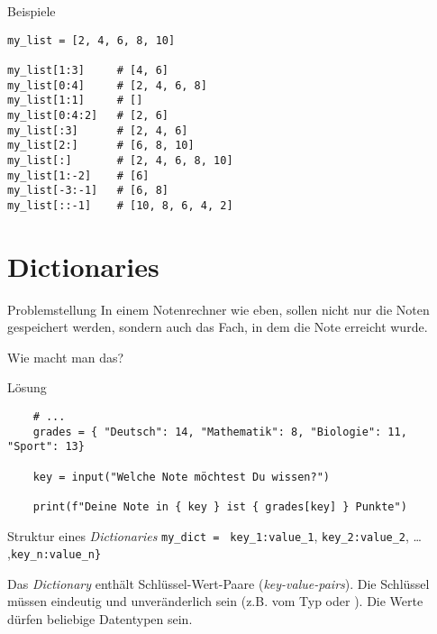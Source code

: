 \begin{fragile}
\begin{exampleblock}{Beispiele}
\begin{overprint}
\begin{verbatim}
my_list = [2, 4, 6, 8, 10]

my_list[1:3]     # [4, 6]
my_list[0:4]     # [2, 4, 6, 8]
my_list[1:1]     # []
my_list[0:4:2]   # [2, 6]
my_list[:3]      # [2, 4, 6]
my_list[2:]      # [6, 8, 10]
my_list[:]       # [2, 4, 6, 8, 10]
my_list[1:-2]    # [6]
my_list[-3:-1]   # [6, 8] 
my_list[::-1]    # [10, 8, 6, 4, 2]  
\end{verbatim}

\end{overprint}
\end{exampleblock}
\end{fragile}

\section{Dictionaries}

\begin{frame}
\begin{block}{Problemstellung}
\vspace{2pt}
In einem Notenrechner wie eben, sollen nicht nur die Noten gespeichert werden, sondern auch das Fach, in dem die Note erreicht wurde. 

\vspace{8pt}

Wie macht man das? 
\end{block}
\end{frame}

\begin{fragile}{}
\begin{block}{Lösung}
	\begin{verbatim}
	# ...
	grades = { "Deutsch": 14, "Mathematik": 8, "Biologie": 11, "Sport": 13}
	
	key = input("Welche Note möchtest Du wissen?")
	
	print(f"Deine Note in { key } ist { grades[key] } Punkte")
	\end{verbatim}
\end{block}
\end{fragile}

\begin{fragile}
	
	\begin{block}{Struktur eines \emph{Dictionaries}}
		\vspace{2pt}
		\large
		\texttt{my\_dict = }\pause {\Large\texttt{\{}}\pause 
		\texttt{key\_1}\pause\texttt{:}\pause\texttt{value\_1}\pause,
		\pause 
		\texttt{key\_2:value\_2}, \pause 
		\dots   
		,\texttt{key\_n:value\_n}\pause \Large{\texttt{\}}}
	\end{block}
	\pause 
	
	Das \emph{Dictionary}  enthält Schlüssel-Wert-Paare (\emph{key-value-pairs}). Die Schlüssel müssen eindeutig und unveränderlich sein (z.B. vom Typ  oder ). Die Werte dürfen beliebige Datentypen sein. 
	
\end{fragile}


